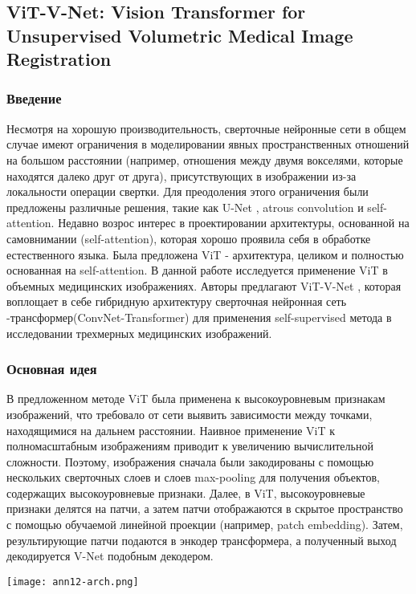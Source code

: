 \subsection*{ViT-V-Net: Vision Transformer for Unsupervised Volumetric Medical Image Registration}

\subsubsection*{Введение}
Несмотря на хорошую производительность, сверточные нейронные сети
в общем случае имеют  ограничения в моделировании явных
пространственных отношений на большом расстоянии (например, 
отношения между двумя вокселями, которые находятся далеко друг от друга), 
присутствующих в изображении из-за локальности операции свертки.
Для преодоления этого ограничения были предложены различные решения, такие как 
U-Net \cite{Unet}, atrous convolution и self-attention. Недавно возрос интерес 
в проектировании архитектуры, основанной на самовнимании (self-attention), 
которая хорошо проявила себя в обработке естественного языка. Была 
предложена ViT - архитектура, целиком и полностью основанная на self-attention.
В данной работе исследуется применение ViT в объемных медицинских изображениях.
Авторы предлагают ViT-V-Net \cite{VitVNet}, которая воплощает в себе гибридную архитектуру
\glqq сверточная нейронная сеть \cite{VNet}-трансформер\grqq (ConvNet-Transformer) для применения self-supervised 
метода в исследовании трехмерных медицинских изображений.
\subsubsection*{Основная идея}
В предложенном методе ViT \cite{Transformers} была применена к высокоуровневым признакам изображений, что
требовало от сети выявить зависимости между точками, находящимися на дальнем расстоянии.
Наивное применение ViT к полномасштабным изображениям приводит к увеличению вычислительной 
сложности. Поэтому, изображения сначала были закодированы с помощью
нескольких сверточных слоев и слоев max-pooling для получения объектов,
содержащих высокоуровневые признаки. Далее, в ViT, высокоуровневые признаки делятся на патчи, 
а затем патчи отображаются в скрытое пространство с помощью обучаемой 
линейной проекции (например, patch embedding). Затем, результирующие патчи 
подаются в энкодер трансформера, а полученный выход декодируется V-Net подобным декодером. 
\\
\begin{minipage}{1.0\linewidth}
    \begin{center}
        \texttt{[image: ann12-arch.png]} \\
    \end{center}
    
\end{minipage}
